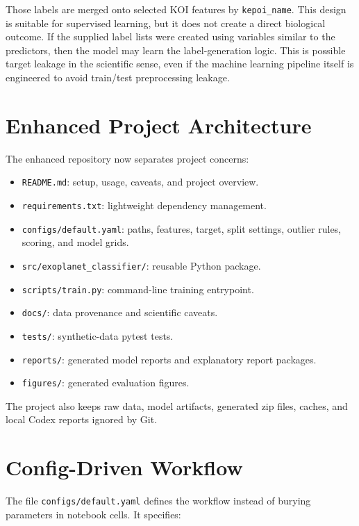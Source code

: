 \documentclass[11pt]{article}
\newcommand{\code}[1]{\texttt{#1}}
\begin{document}
Those labels are merged onto selected KOI features by \code{kepoi\_name}. This design is suitable for supervised learning, but it does not create a direct biological outcome. If the supplied label lists were created using variables similar to the predictors, then the model may learn the label-generation logic. This is possible target leakage in the scientific sense, even if the machine learning pipeline itself is engineered to avoid train/test preprocessing leakage.

\section{Enhanced Project Architecture}

The enhanced repository now separates project concerns:

\begin{itemize}
  \item \code{README.md}: setup, usage, caveats, and project overview.
  \item \code{requirements.txt}: lightweight dependency management.
  \item \code{configs/default.yaml}: paths, features, target, split settings, outlier rules, scoring, and model grids.
  \item \code{src/exoplanet\_classifier/}: reusable Python package.
  \item \code{scripts/train.py}: command-line training entrypoint.
  \item \code{docs/}: data provenance and scientific caveats.
  \item \code{tests/}: synthetic-data pytest tests.
  \item \code{reports/}: generated model reports and explanatory report packages.
  \item \code{figures/}: generated evaluation figures.
\end{itemize}

The project also keeps raw data, model artifacts, generated zip files, caches, and local Codex reports ignored by Git.

\section{Config-Driven Workflow}

The file \code{configs/default.yaml} defines the workflow instead of burying parameters in notebook cells. It specifies:
\end{document}
